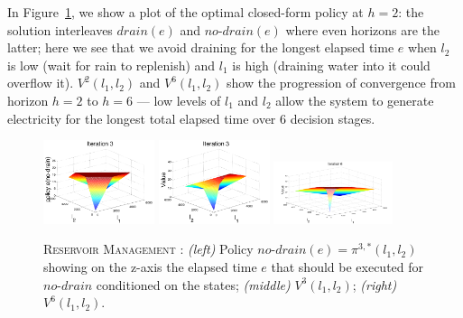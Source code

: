 \documentclass[twoside,11pt]{article}
\newcommand{\WaterReservoir}{\textsc{Reservoir Management }}
\begin{document}
In Figure~\ref{fig:v2plots}, we show a plot of 
the optimal closed-form policy at $h=2$: the solution interleaves $\mathit{drain}(e)$ and $\mathit{no}$-$\mathit{drain}(e)$ where even horizons are the latter;
here we see that we avoid draining for the longest elapsed time $e$ 
when $l_2$ is low (wait for rain to replenish) and $l_1$ is high (draining
water into it could overflow it).  $V^2(l_1,l_2)$ and $V^6(l_1,l_2)$
show the progression of convergence from horizon $h=2$ to $h=6$ ---
low levels of $l_1$ and $l_2$ allow the system to generate electricity
for the longest total elapsed time over 6 decision stages. 
\begin{figure}[tbp!]
\vspace{-2mm}
\centering
\includegraphics[width=0.29\textwidth]{Figures2/camdp/q3.pdf}
\includegraphics[width=0.29\textwidth]{Figures2/camdp/v3.pdf}
\includegraphics[width=0.31\textwidth]{Figures2/camdp/v6.pdf}
\vspace{-3mm}
\caption{%
\WaterReservoir: 
{\it (left)} Policy $\mathit{no}$-$\mathit{drain}(e)=\pi^{3,*}(l_1,l_2)$ 
showing on the z-axis the elapsed time $e$ that should be executed 
for $\mathit{no}$-$\mathit{drain}$ conditioned on the states; 
{\it (middle)} $V^3(l_1,l_2)$; 
{\it (right)} $V^6(l_1,l_2)$.
}
\label{fig:v2plots}
\vspace{-4mm}
\end{figure}
\end{document}

